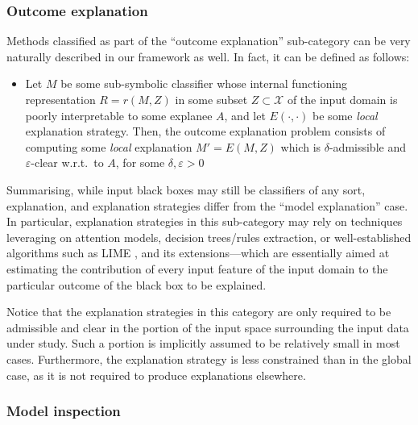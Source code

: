 \documentclass[12pt,a4paper,openright,twoside]{book}
\begin{document}
\subsubsection{Outcome explanation}

Methods classified as part of the ``outcome explanation'' sub-category can be very naturally described in our framework as well.
%
In fact, it can be defined as follows:
%
\begin{itemize}
    \item[] Let $M$ be some sub-symbolic classifier whose internal functioning representation $R = r(M, Z)$ in some subset $Z \subset \mathcal{X}$ of the input domain is poorly interpretable to some explanee $A$, and let $E(\cdot, \cdot)$ be some \emph{local} explanation strategy.
    Then, the outcome explanation problem consists of computing some \emph{local} explanation $M' = E(M, Z)$ which is $\delta$-admissible and $\varepsilon$-clear w.r.t.\ to $A$, for some $\delta, \varepsilon > 0$
\end{itemize}
%
Summarising, while input black boxes may still be classifiers of any sort, explanation, and explanation strategies differ from the ``model explanation'' case.
%
In particular, explanation strategies in this sub-category may rely on techniques leveraging on attention models, decision trees/rules extraction, or well-established algorithms such as LIME \cite{RibeiroSG16}, and its extensions---which are essentially aimed at estimating the contribution of every input feature of the input domain to the particular outcome of the black box to be explained.

Notice that the explanation strategies in this category are only required to be admissible and clear in the portion of the input space surrounding the input data under study.
%
Such a portion is implicitly assumed to be relatively small in most cases.
%
Furthermore, the explanation strategy is less constrained than in the global case, as it is not required to produce explanations elsewhere.

\subsubsection{Model inspection}
\end{document}
